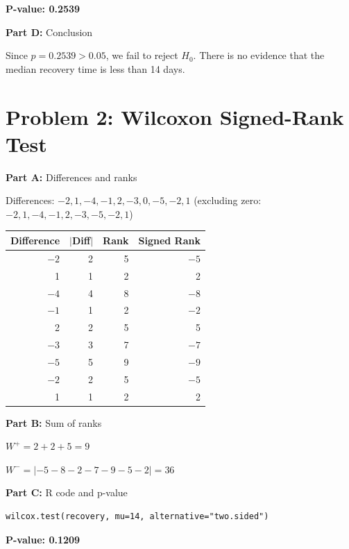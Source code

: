 \documentclass[11pt]{article}
\begin{document}
\textbf{P-value: 0.2539}

\vspace{6pt}

\textbf{Part D:} Conclusion

Since $p = 0.2539 > 0.05$, we fail to reject $H_0$. There is no evidence that the median recovery time is less than 14 days.

\newpage

\section{Problem 2: Wilcoxon Signed-Rank Test}

\textbf{Part A:} Differences and ranks

Differences: $-2, 1, -4, -1, 2, -3, 0, -5, -2, 1$ (excluding zero: $-2, 1, -4, -1, 2, -3, -5, -2, 1$)

\begin{center}
\begin{tabular}{rrrr}
\toprule
Difference & $|$Diff$|$ & Rank & Signed Rank \\
\midrule
$-2$ & 2 & 5 & $-5$ \\
1 & 1 & 2 & 2 \\
$-4$ & 4 & 8 & $-8$ \\
$-1$ & 1 & 2 & $-2$ \\
2 & 2 & 5 & 5 \\
$-3$ & 3 & 7 & $-7$ \\
$-5$ & 5 & 9 & $-9$ \\
$-2$ & 2 & 5 & $-5$ \\
1 & 1 & 2 & 2 \\
\bottomrule
\end{tabular}
\end{center}

\vspace{6pt}

\textbf{Part B:} Sum of ranks

$W^+ = 2 + 2 + 5 = 9$

$W^- = |-5 - 8 - 2 - 7 - 9 - 5 - 2| = 36$

\vspace{6pt}

\textbf{Part C:} R code and p-value

\begin{lstlisting}
wilcox.test(recovery, mu=14, alternative="two.sided")
\end{lstlisting}

\textbf{P-value: 0.1209}
\end{document}
